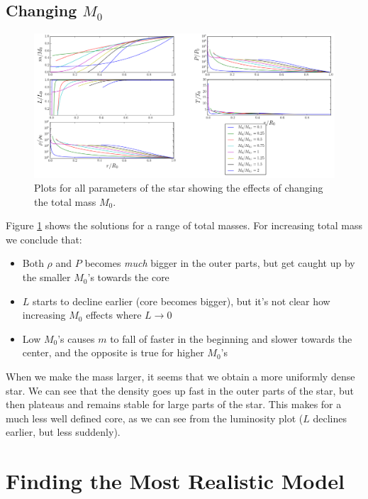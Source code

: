\documentclass[11pt,twocolumn]{article}
\begin{document}
\subsection{Changing $M_0$}

\begin{figure}[ht]
  \centering
  \includegraphics[width=\linewidth]{fig/M_variation.png}
  \caption{\label{fig:M-variation} Plots for all parameters of the star
  showing the effects of changing the total mass $M_0$.}
\end{figure}


Figure \ref{fig:M-variation} shows the solutions for a range of total
masses. For increasing total mass we conclude that:

\begin{itemize}
  \item Both $\rho$ and $P$ becomes \emph{much} bigger in the outer
    parts, but get caught up by the smaller $M_0$'s towards the core
  \item $L$ starts to decline earlier (core becomes bigger), but it's
    not clear how increasing $M_0$ effects where $L\rightarrow 0$
  \item Low $M_0$'s causes $m$ to fall of faster in the beginning and
    slower towards the center, and the opposite is true for higher $M_0$'s
\end{itemize}

When we make the mass larger, it seems that we obtain a more uniformly
dense star. We can see that the density goes up fast in the outer
parts of the star, but then plateaus and remains stable for large
parts of the star. This makes for a much less well defined core, as we
can see from the luminosity plot ($L$ declines earlier, but less
suddenly). 


\section{Finding the Most Realistic Model}
\end{document}
